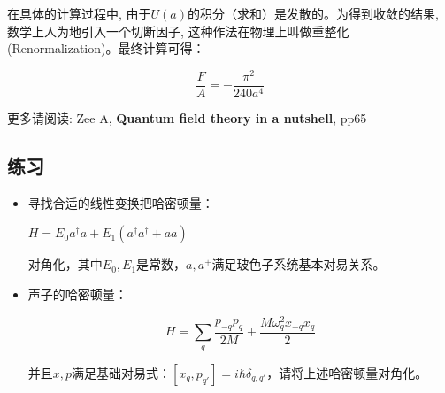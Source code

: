 
在具体的计算过程中,
由于$U(a)$的积分（求和）是发散的。为得到收敛的结果,
数学上人为地引入一个切断因子,
这种作法在物理上叫做重整化(Renormalization)。最终计算可得：


\begin{equation*}
   \frac{F}{A}=-\frac{\pi^2}{240a^4}
\end{equation*}


更多请阅读: Zee A, \textbf{Quantum field theory in a nutshell}, pp65



\subsection*{练习}

\begin{itemize}

    \item 寻找合适的线性变换把哈密顿量：

\begin{center}
$H = E_0 a^\dagger a + E_1 (a^\dagger a^\dagger + a a)$
\end{center}

对角化，其中$E_0, E_1$是常数，$a, a^+$满足玻色子系统基本对易关系。

\item 声子的哈密顿量：

\begin{equation}
H = \sum\limits_q \frac{p_{-q}p_q }{2M} + \frac{M \omega_q^2 x_{-q} x_q}{2}
\end{equation}

并且$x, p$满足基础对易式：$[ x_q , p_{q'} ] = i \hbar \delta_{q,q'} $，请将上述哈密顿量对角化。

\end{itemize}




